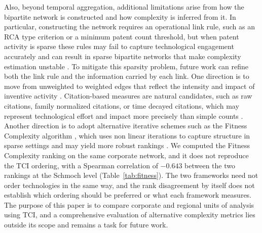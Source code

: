 \documentclass[lineno,pdflatex,sn-mathphys-num]{sn-jnl}%
\theoremstyle{thmstyleone}%
\theoremstyle{thmstyletwo}%
\theoremstyle{thmstylethree}%
\begin{document}
Also, beyond temporal aggregation, additional limitations arise from how the bipartite network is constructed and how complexity is inferred from it.
In particular, constructing the network requires an operational link rule, such as an RCA type criterion or a minimum patent count threshold, but when patent activity is sparse these rules may fail to capture technological engagement accurately and can result in sparse bipartite networks that make complexity estimation unstable \cite{PintarEssletzbichler2022}.
To mitigate this sparsity problem, future work can refine both the link rule and the information carried by each link.
One direction is to move from unweighted to weighted edges that reflect the intensity and impact of inventive activity \cite{ivanova2017economic}.
Citation-based measures are natural candidates, such as raw citations, family normalized citations, or time decayed citations, which may represent technological effort and impact more precisely than simple counts \cite{PintarScherngell2022}.
Another direction is to adopt alternative iterative schemes such as the Fitness Complexity algorithm \cite{Tacchella2012}, which uses non linear iterations to capture structure in sparse settings and may yield more robust rankings \cite{Wu2016,Albeaik2017}.
We computed the Fitness Complexity ranking on the same corporate network, and it does not reproduce the TCI ordering, with a Spearman correlation of $-0.643$ between the two rankings at the Schmoch level (Table~\ref{tab:fitness}).
The two frameworks need not order technologies in the same way, and the rank disagreement by itself does not establish which ordering should be preferred or what each framework measures.
The purpose of this paper is to compare corporate and regional units of analysis using TCI, and a comprehensive evaluation of alternative complexity metrics lies outside its scope and remains a task for future work.
\end{document}
